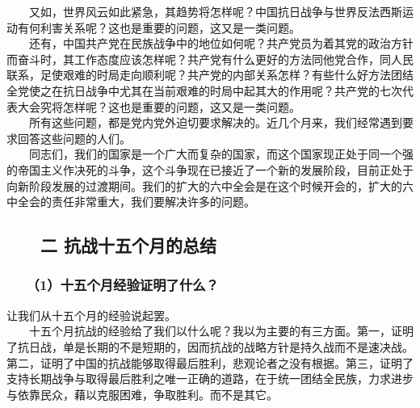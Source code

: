 \documentclass[cn,11pt,chinese]{elegantbook}
\def\myformat#1{\hfil\hfil #1}
\begin{document}
　　又如，世界风云如此紧急，其趋势将怎样呢？中国抗日战争与世界反法西斯运动有何利害关系呢？这也是重要的问题，这又是一类问题。\\
　　还有，中国共产党在民族战争中的地位如何呢？共产党员为着其党的政治方针而奋斗时，其工作态度应该怎样呢？共产党有什么更好的方法同他党合作，同人民联系，足使艰难的时局走向顺利呢？共产党的内部关系怎样？有些什么好方法团结全党使之在抗日战争中尤其在当前艰难的时局中起其大的作用呢？共产党的七次代表大会究将怎样呢？这也是重要的问题，这又是一类问题。\\
　　所有这些问题，都是党内党外迫切要求解决的。近几个月来，我们经常遇到要求回答这些问题的人们。\\
　　同志们，我们的国家是一个广大而复杂的国家，而这个国家现正处于同一个强的帝国主义作决死的斗争，这个斗争现在已接近了一个新的发展阶段，目前正处于向新阶段发展的过渡期间。我们的扩大的六中全会是在这个时候开会的，扩大的六中全会的责任非常重大，我们要解决许多的问题。\\
\subsection*{\myformat{　　二 抗战十五个月的总结}}
\subsubsection*{\myformat{　　（1）十五个月经验证明了什么？}}
让我们从十五个月的经验说起罢。\\
　　十五个月抗战的经验给了我们以什么呢？我以为主要的有三方面。第一，证明了抗日战，单是长期的不是短期的，因而抗战的战略方针是持久战而不是速决战。第二，证明了中国的抗战能够取得最后胜利，悲观论者之没有根据。第三，证明了支持长期战争与取得最后胜利之唯一正确的道路，在于统一团结全民族，力求进步与依靠民众，藉以克服困难，争取胜利。而不是其它。\\
\end{document}
